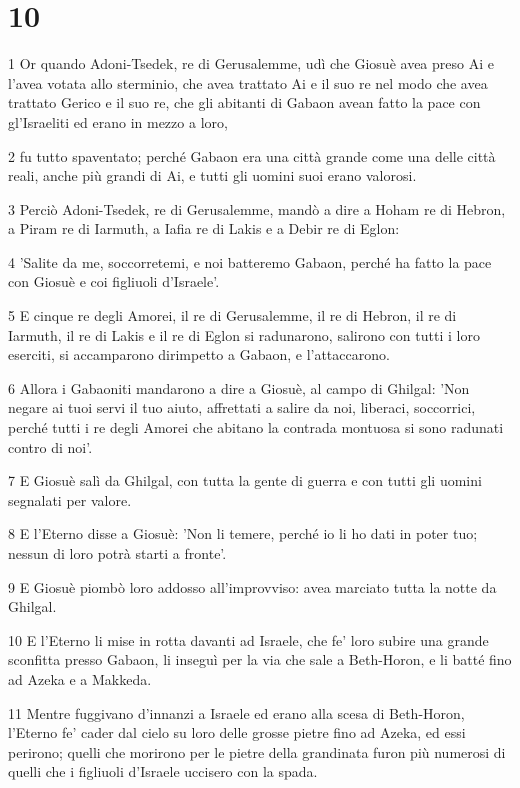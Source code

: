 \chapter{10}

\par 1 Or quando Adoni-Tsedek, re di Gerusalemme, udì che Giosuè avea preso Ai e l'avea votata allo sterminio, che avea trattato Ai e il suo re nel modo che avea trattato Gerico e il suo re, che gli abitanti di Gabaon avean fatto la pace con gl'Israeliti ed erano in mezzo a loro,
\par 2 fu tutto spaventato; perché Gabaon era una città grande come una delle città reali, anche più grandi di Ai, e tutti gli uomini suoi erano valorosi.
\par 3 Perciò Adoni-Tsedek, re di Gerusalemme, mandò a dire a Hoham re di Hebron, a Piram re di Iarmuth, a Iafia re di Lakis e a Debir re di Eglon:
\par 4 'Salite da me, soccorretemi, e noi batteremo Gabaon, perché ha fatto la pace con Giosuè e coi figliuoli d'Israele'.
\par 5 E cinque re degli Amorei, il re di Gerusalemme, il re di Hebron, il re di Iarmuth, il re di Lakis e il re di Eglon si radunarono, salirono con tutti i loro eserciti, si accamparono dirimpetto a Gabaon, e l'attaccarono.
\par 6 Allora i Gabaoniti mandarono a dire a Giosuè, al campo di Ghilgal: 'Non negare ai tuoi servi il tuo aiuto, affrettati a salire da noi, liberaci, soccorrici, perché tutti i re degli Amorei che abitano la contrada montuosa si sono radunati contro di noi'.
\par 7 E Giosuè salì da Ghilgal, con tutta la gente di guerra e con tutti gli uomini segnalati per valore.
\par 8 E l'Eterno disse a Giosuè: 'Non li temere, perché io li ho dati in poter tuo; nessun di loro potrà starti a fronte'.
\par 9 E Giosuè piombò loro addosso all'improvviso: avea marciato tutta la notte da Ghilgal.
\par 10 E l'Eterno li mise in rotta davanti ad Israele, che fe' loro subire una grande sconfitta presso Gabaon, li inseguì per la via che sale a Beth-Horon, e li batté fino ad Azeka e a Makkeda.
\par 11 Mentre fuggivano d'innanzi a Israele ed erano alla scesa di Beth-Horon, l'Eterno fe' cader dal cielo su loro delle grosse pietre fino ad Azeka, ed essi perirono; quelli che morirono per le pietre della grandinata furon più numerosi di quelli che i figliuoli d'Israele uccisero con la spada.
